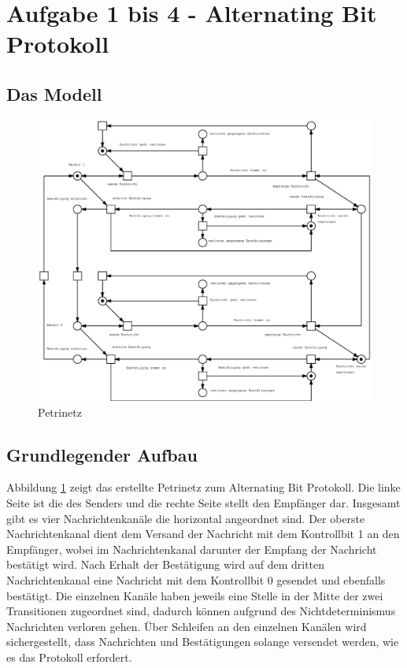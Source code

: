 \documentclass[10pt]{scrartcl}
\author{Carsten Noetzel, Armin Steudte}
\title{\titletext}
\date{23.03.2012}
\begin{document}
\maketitle

\setcounter{tocdepth}{3}
\tableofcontents
\listoffigures

\section{Aufgabe 1 bis 4  - Alternating Bit Protokoll}
\subsection{Das Modell}
\begin{figure}[htbp]
	\centering	\includegraphics[width=1.0\textwidth]{Bilder/Praktikum1_1.eps}
	\caption{Petrinetz}
	\label{fig:Netz}
\end{figure} 

\subsection{Grundlegender Aufbau}
Abbildung \ref{fig:Netz} zeigt das erstellte Petrinetz zum Alternating Bit Protokoll. Die linke Seite ist die des Senders und die rechte Seite stellt den Empfänger dar. Insgesamt gibt es vier Nachrichtenkanäle die horizontal angeordnet sind. Der oberste Nachrichtenkanal dient dem Versand der Nachricht mit dem Kontrollbit 1 an den Empfänger, wobei im Nachrichtenkanal darunter der Empfang der Nachricht bestätigt wird. Nach Erhalt der Bestätigung wird auf dem dritten Nachrichtenkanal eine Nachricht mit dem Kontrollbit 0 gesendet und ebenfalls bestätigt. Die einzelnen Kanäle haben jeweils eine Stelle in der Mitte der zwei Transitionen zugeordnet sind, dadurch können aufgrund des Nichtdeterminismus Nachrichten verloren gehen. Über Schleifen an den einzelnen Kanälen wird sichergestellt, dass Nachrichten und Bestätigungen solange versendet werden, wie es das Protokoll erfordert.\\
\end{document}
